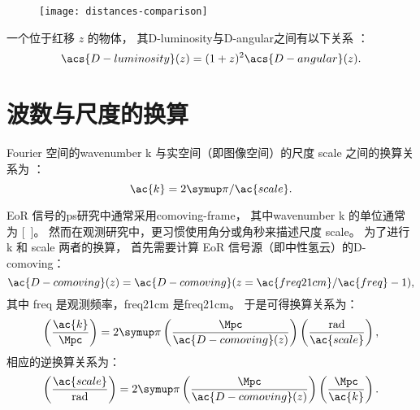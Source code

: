\begin{figure}[htp]
  \centering
  \texttt{[image: distances-comparison]}
  \label{fig:distance-measures}
\end{figure}

一个位于红移 $z$ 的物体，
其\acl{D-luminosity}与\acl{D-angular}之间有以下关系
\cite{weinberg1972,hogg1999,ellis2007}：
\begin{equation}
  \label{eq:dl-da}
  \acs{D-luminosity}(z) = (1+z)^2 \acs{D-angular}(z) .
\end{equation}


\section{波数与尺度的换算}
\label{sec:wavenumber-scale-conv}

Fourier 空间的\ac{wavenumber} \ac{k} 与实空间（即图像空间）的尺度 \ac{scale}
之间的换算关系为 \cite{peebles1980,baugh2000}：
\begin{equation}
  \ac{k} = 2\Cpi / \ac{scale} .
\end{equation}

EoR 信号的\ac{ps}研究中通常采用\ac{comoving-frame}，
其中\ac{wavenumber} \ac{k} 的单位通常为 [\si{\per\Mpc}]。
然而在观测研究中，更习惯使用角分或角秒来描述尺度 \ac{scale}。
为了进行 \ac{k} 和 \ac{scale} 两者的换算，
首先需要计算 EoR 信号源（即中性氢云）的\acl{D-comoving}：
\begin{equation}
  \ac{D-comoving}(z) =
    \ac{D-comoving}(z = \ac{freq21cm} / \ac{freq} - 1) ,
\end{equation}
其中 \ac{freq} 是观测频率，\ac{freq21cm} 是\acl{freq21cm}。
于是可得换算关系为：
\begin{equation}
  \left( \frac{\ac{k}}{\si{\per\Mpc}} \right) =
    2\Cpi \left( \frac{\si{\Mpc}}{\ac{D-comoving}(z)} \right)
    \left( \frac{\si{rad}}{\ac{scale}} \right) ,
\end{equation}
相应的逆换算关系为：
\begin{equation}
  \left( \frac{\ac{scale}}{\si{rad}} \right) =
    2\Cpi \left( \frac{\si{\Mpc}}{\ac{D-comoving}(z)} \right)
    \left( \frac{\si{\per\Mpc}}{\ac{k}} \right) .
\end{equation}

